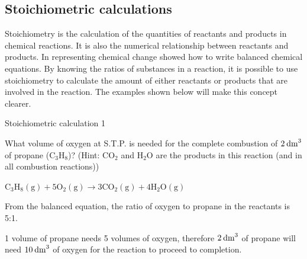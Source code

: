             \subsection{ Stoichiometric calculations}
            \nopagebreak
      \label{m38712*id283990}Stoichiometry is the calculation of the quantities of reactants and products in chemical reactions. It is also the numerical relationship between reactants and products. In  representing chemical change showed how to write balanced chemical equations. By knowing the ratios of substances in a reaction, it is possible to use stoichiometry to calculate the amount of either reactants or products that are involved in the reaction. The examples shown below will make this concept clearer.\par 
\label{m38712*secfhsst!!!underscore!!!id1903}\vspace{.5cm}  
      \begin{wex}{Stoichiometric calculation 1 }
{

      \label{m38712*probfhsst!!!underscore!!!id1904}
      \label{m38712*id275479}What volume of oxygen at S.T.P. is needed for the complete combustion of $2\phantom{\rule{2pt}{0ex}}{\mathrm{dm}}^{3}$ of propane ($\mathrm{C}{}_{3}\mathrm{H}{}_{8}$)? (Hint: $\mathrm{CO}{}_{2}$ and $\mathrm{H}{}_{2}\mathrm{O}$ are the products in this reaction (and in all combustion reactions))\par 
      \vspace{5pt}}
{
      \label{m38712*id284189}${\mathrm{C}}_{3}{\mathrm{H}}_{8}\left(\mathrm{g}\right)+5{\mathrm{O}}_{2}\left(\mathrm{g}\right)\to 3\mathrm{C}{\mathrm{O}}_{2}\left(\mathrm{g}\right)+4{\mathrm{H}}_{2}\mathrm{O}\left(\mathrm{g}\right)$
      \par 
      \label{m38712*id284294}From the balanced equation, the ratio of oxygen to propane in the reactants is 5:1.\par 
      \label{m38712*id284304}1 volume of propane needs 5 volumes of oxygen, therefore $2\phantom{\rule{2pt}{0ex}}{\mathrm{dm}}^{3}$ of propane will need $10\phantom{\rule{2pt}{0ex}}{\mathrm{dm}}^{3}$ of oxygen for the reaction to proceed to completion.\par 
}
    \end{wex}
    \noindent
\label{m38712*secfhsst!!!underscore!!!id1972}\vspace{.5cm} 
